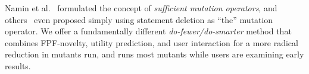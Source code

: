 Namin et al.~\cite{namin2006finding,namin2008sufficient} formulated the
concept of \emph{sufficient mutation operators}, and
others~\cite{untch2009onreduced, deng2013empirical} even proposed simply using statement
deletion as ``the'' mutation operator.  
We offer a fundamentally
different \emph{do-fewer/do-smarter} method that combines FPF-novelty, utility
prediction, and user interaction for a more radical reduction in
mutants run, and runs most mutants while users are examining early results.


%

